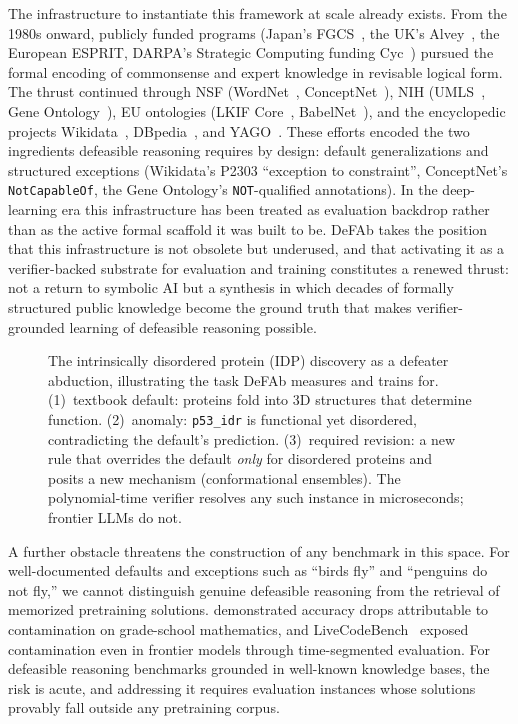 \documentclass{article}
\theoremstyle{definition}
\begin{document}
The infrastructure to instantiate this framework at scale already exists. From the 1980s onward, publicly funded programs (Japan's FGCS~\citep{fuchi1984aiming, feigenbaum1993fgcs}, the UK's Alvey~\citep{alvey1985ikbs}, the European ESPRIT, DARPA's Strategic Computing funding Cyc~\citep{lenat1990cyc, lenat1995cyc}) pursued the formal encoding of commonsense and expert knowledge in revisable logical form. The thrust continued through NSF (WordNet~\citep{miller1995wordnet}, ConceptNet~\citep{speer2017conceptnet}), NIH (UMLS~\citep{lindberg1993umls}, Gene Ontology~\citep{ashburner2000go}), EU ontologies (LKIF Core~\citep{lkif2007}, BabelNet~\citep{navigli2012babelnet}), and the encyclopedic projects Wikidata~\citep{vrandecic2014wikidata}, DBpedia~\citep{lehmann2015dbpedia}, and YAGO~\citep{suchanek2024yago}. These efforts encoded the two ingredients defeasible reasoning requires by design: default generalizations and structured exceptions (Wikidata's P2303 ``exception to constraint'', ConceptNet's \texttt{NotCapableOf}, the Gene Ontology's \texttt{NOT}-qualified annotations). In the deep-learning era this infrastructure has been treated as evaluation backdrop rather than as the active formal scaffold it was built to be. DeFAb takes the position that this infrastructure is not obsolete but underused, and that activating it as a verifier-backed substrate for evaluation and training constitutes a renewed thrust: not a return to symbolic AI but a synthesis in which decades of formally structured public knowledge become the ground truth that makes verifier-grounded learning of defeasible reasoning possible.

\begin{figure}[t]
\centering
\resizebox{\textwidth}{!}{}
\caption{The intrinsically disordered protein (IDP) discovery as a defeater abduction, illustrating the task DeFAb measures and trains for. (1)~textbook default: proteins fold into 3D structures that determine function. (2)~anomaly: \texttt{p53\_idr} is functional yet disordered, contradicting the default's prediction. (3)~required revision: a new rule that overrides the default \emph{only} for disordered proteins and posits a new mechanism (conformational ensembles). The polynomial-time verifier resolves any such instance in microseconds; frontier LLMs do not.}
\label{fig:intuition}
\end{figure}

A further obstacle threatens the construction of any benchmark in this space. For well-documented defaults and exceptions such as ``birds fly'' and ``penguins do not fly,'' we cannot distinguish genuine defeasible reasoning from the retrieval of memorized pretraining solutions. \citet{zhang2024gsm1k} demonstrated accuracy drops attributable to contamination on grade-school mathematics, and LiveCodeBench~\citep{jain2025livecodebench} exposed contamination even in frontier models through time-segmented evaluation. For defeasible reasoning benchmarks grounded in well-known knowledge bases, the risk is acute, and addressing it requires evaluation instances whose solutions provably fall outside any pretraining corpus.
\end{document}
